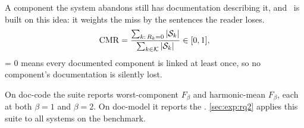 A component the system abandons still has documentation describing it, and \cmr\ is built on this idea: 
it weights the miss by the sentences the reader loses.
\begin{equation}
\mathrm{CMR} = \frac{\sum_{k:\,R_k=0} |\mathcal{S}_k|}{\sum_{k \in \mathcal{K}} |\mathcal{S}_k|} \in [0,1],
\label{eq:cmr}
\end{equation}
\cmr{} = 0 means every documented component is linked at least once, so no component's documentation is silently lost.


On doc-code the suite reports worst-component $F_\beta$ and harmonic-mean $F_\beta$, each at both $\beta = 1$ and $\beta = 2$.
On doc-model it reports the \cmrname{}.
\autoref{sec:exp:rq2} applies this suite to all systems on the benchmark.
